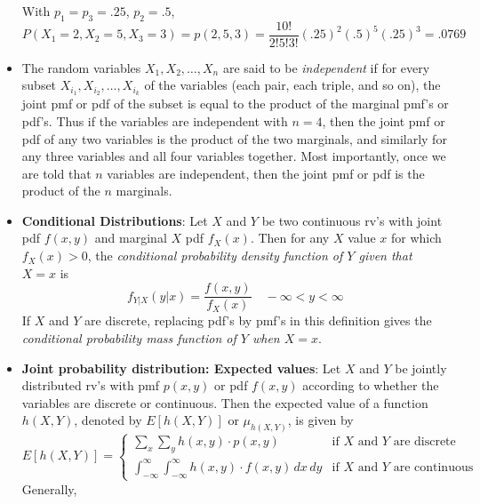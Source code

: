 \documentclass{report}
\begin{document}
\begin{itemize}
\[            \]
            With \( p_1 = p_3 = .25 \), \( p_2 = .5 \),
            \[
                P(X_1 = 2, X_2 = 5, X_3 = 3) = p(2, 5, 3) = \frac{10!}{2! 5! 3!} (.25)^2 (.5)^5 (.25)^3 = .0769
            \]
        \item The random variables \( X_1, X_2, \ldots, X_n \) are said to be \textit{independent} if for every subset \( X_{i_1}, X_{i_2}, \ldots, X_{i_k} \) of the variables (each pair, each triple, and so on), the joint pmf or pdf of the subset is equal to the product of the marginal pmf's or pdf's.
            \bigbreak \noindent 
            Thus if the variables are independent with $n=4$, then the joint pmf or pdf of any two
            variables is the product of the two marginals, and similarly for any three variables and
            all four variables together. Most importantly, once we are told that $n$ variables are
            independent, then the joint pmf or pdf is the product of the $n$ marginals.
        \item \textbf{Conditional Distributions}:
            Let \( X \) and \( Y \) be two continuous rv’s with joint pdf \( f(x, y) \) and marginal \( X \) pdf \( f_X(x) \). Then for any \( X \) value \( x \) for which \( f_X(x) > 0 \), the \textit{conditional probability density function of \( Y \) given that \( X = x \)} is
            \[
                f_{Y|X}(y|x) = \frac{f(x, y)}{f_X(x)} \quad -\infty < y < \infty
            \]
            If \( X \) and \( Y \) are discrete, replacing pdf’s by pmf’s in this definition gives the \textit{conditional probability mass function of \( Y \) when \( X = x \)}.
        \item \textbf{Joint probability distribution: Expected values}:
            Let \( X \) and \( Y \) be jointly distributed rv's with pmf \( p(x, y) \) or pdf \( f(x, y) \) according to whether the variables are discrete or continuous. Then the expected value of a function \( h(X, Y) \), denoted by \( E[h(X, Y)] \) or \( \mu_{h(X, Y)} \), is given by
            \[
                E[h(X, Y)] =
                \begin{cases} 
                    \sum_{x} \sum_{y} h(x, y) \cdot p(x, y) & \text{if } X \text{ and } Y \text{ are discrete} \\[10pt]
                    \int_{-\infty}^{\infty} \int_{-\infty}^{\infty} h(x, y) \cdot f(x, y) \, dx \, dy & \text{if } X \text{ and } Y \text{ are continuous}
                \end{cases}
            \]
            Generally,
            \begin{align*}

\end{align*}
\end{itemize}
\end{document}
